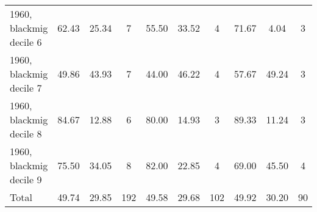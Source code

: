 \begin{table}[htbp]
\begin{tabular}{l*{3}{ccc}}
1960, blackmig decile 6&       62.43&       25.34&           7&       55.50&       33.52&           4&       71.67&        4.04&           3\\
1960, blackmig decile 7&       49.86&       43.93&           7&       44.00&       46.22&           4&       57.67&       49.24&           3\\
1960, blackmig decile 8&       84.67&       12.88&           6&       80.00&       14.93&           3&       89.33&       11.24&           3\\
1960, blackmig decile 9&       75.50&       34.05&           8&       82.00&       22.85&           4&       69.00&       45.50&           4\\
Total               &       49.74&       29.85&         192&       49.58&       29.68&         102&       49.92&       30.20&          90\\
\bottomrule
\end{tabular}
\end{table}
